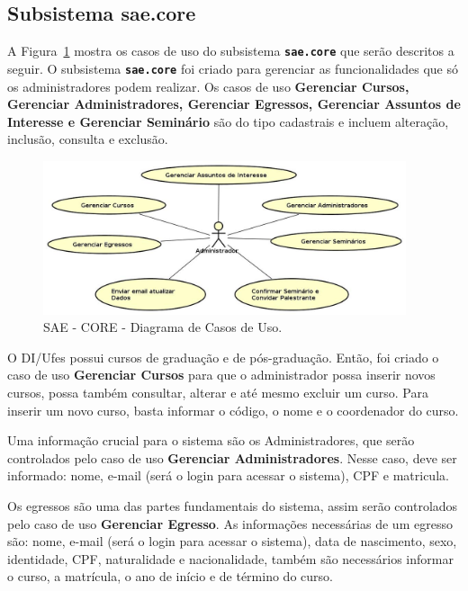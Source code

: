 	
\newpage	
\subsection{Subsistema sae.core}
\label{sec-requisitos-casos-de-uso-core}

A Figura~\ref{fig-requisitos-core-diagrama-casos-uso} mostra os casos de uso do subsistema \textbf{\texttt{sae.core}} que serão descritos a seguir. O subsistema \textbf{\texttt{sae.core}} foi criado para gerenciar as funcionalidades que só os administradores podem realizar. Os casos de uso \textbf{Gerenciar Cursos, Gerenciar Administradores, Gerenciar Egressos, Gerenciar Assuntos de Interesse e Gerenciar Seminário } são do tipo cadastrais e incluem alteração, inclusão, consulta e exclusão. 

\begin{figure}[h]
	\centering
	\includegraphics[width=0.95\textwidth]{figuras/requisitos/casodeuso-core}
	\caption{SAE - CORE - Diagrama de Casos de Uso.}
	\label{fig-requisitos-core-diagrama-casos-uso}
\end{figure}

O DI/Ufes possui cursos de graduação e de pós-graduação. Então, foi criado o caso de uso \textbf{Gerenciar Cursos} para que o administrador possa inserir novos cursos, possa também consultar, alterar e até mesmo excluir um curso. Para inserir um novo curso, basta informar o código, o nome e o coordenador do curso.

Uma informação crucial para o sistema são os Administradores, que serão controlados pelo caso de uso \textbf{Gerenciar Administradores}. Nesse caso, deve ser informado: nome, e-mail (será o login para acessar o sistema), CPF e matricula.

Os egressos são uma das partes fundamentais do sistema, assim serão controlados pelo caso de uso \textbf{Gerenciar Egresso}. As informações necessárias de um egresso são: nome, e-mail (será o login para acessar o sistema), data de nascimento, sexo, identidade, CPF, naturalidade e nacionalidade, também são necessários informar o curso, a matrícula, o ano de início e de término do curso.  

